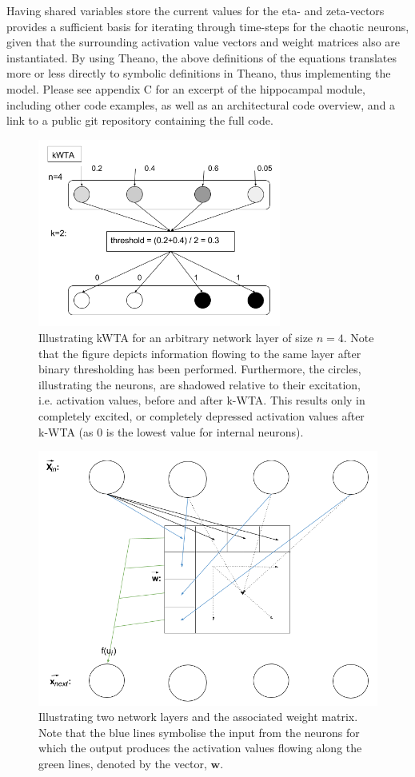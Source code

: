 Having shared variables store the current values for the eta- and zeta-vectors provides a sufficient basis for iterating through time-steps for the chaotic neurons, given that the surrounding activation value vectors and weight matrices also are instantiated. By using Theano, the above definitions of the equations translates more or less directly to symbolic definitions in Theano, thus implementing the model. Please see appendix C for an excerpt of the hippocampal module, including other code examples, as well as an architectural code overview, and a link to a public git repository containing the full code.

\begin{figure}
    \centering
    \includegraphics[width=8cm]{fig/kWTA}
    \caption{Illustrating kWTA for an arbitrary network layer of size $n=4$. Note that the figure depicts information flowing to  the same layer after binary thresholding has been performed. Furthermore, the circles, illustrating the neurons, are shadowed relative to their excitation, i.e. activation values, before and after k-WTA. This results only in completely excited, or completely depressed activation values after k-WTA (as 0 is the lowest value for internal neurons).}
    \label{fig:kWTA_illustration}
\end{figure}

\begin{figure}
    \centering
    \includegraphics[width=12cm]{fig/network_propagation}
    \caption{Illustrating two network layers and the associated weight matrix. Note that the blue lines symbolise the input from the neurons for which the output produces the activation values flowing along the green lines, denoted by the vector, $\textbf{w}$.}
    \label{fig:network_layout}
\end{figure}


